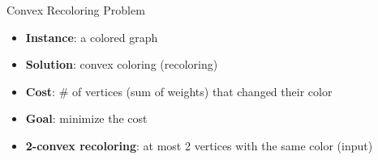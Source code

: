 \begin{frame}{Convex Recoloring Problem}
\begin{itemize}


\item
\textbf{Instance}: a colored graph

\pause\item
\textbf{Solution}: convex coloring (recoloring)

\pause\item
\textbf{Cost}: \# of vertices {\tiny(sum of weights)} that changed their color

\pause\item
\textbf{Goal}: minimize the cost


\end{itemize}
\pause

\begin{itemize}
\pause\item
\textbf{2-convex recoloring}: at most 2 vertices with the same color (input) 
\end{itemize}


\end{frame}
